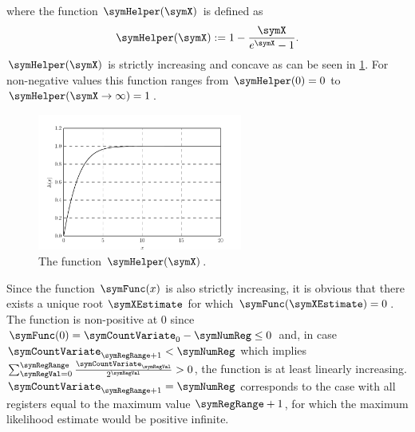 \documentclass[a4paper]{scrartcl}
\begin{document}
where the function $\symHelper(\symX)$ is defined as
\begin{equation}
\label{equ:helper}
\symHelper(\symX):=1-\frac{\symX}{e^{\symX}-1}.
\end{equation}
$\symHelper(\symX)$ is strictly increasing and concave as can be seen in \cref{fig:helper_function}. For non-negative values this function ranges from $\symHelper(0)=0$ to $\symHelper(\symX\rightarrow \infty)=1$.
\begin{figure}
\centering
\includegraphics[width=0.6\textwidth]{helper}
\caption{The function $\symHelper(\symX)$.}
\label{fig:helper_function}
\end{figure}
Since the function $\symFunc(x)$ is also strictly increasing, it is obvious that there exists a unique root $\symXEstimate$ for which $\symFunc(\symXEstimate)=0$. The function is non-positive at 0 since $\symFunc(0)=\symCountVariate_0-\symNumReg\leq 0$ and, in case $\symCountVariate_{\symRegRange+1}<\symNumReg$ which implies $\sum_{\symRegVal=0}^\symRegRange \frac{\symCountVariate_\symRegVal}{2^\symRegVal}>0$, the function is at least linearly increasing. $\symCountVariate_{\symRegRange+1}=\symNumReg$ corresponds to the case with all registers equal to the maximum value $\symRegRange+1$, for which the maximum likelihood estimate would be positive infinite.
\end{document}

